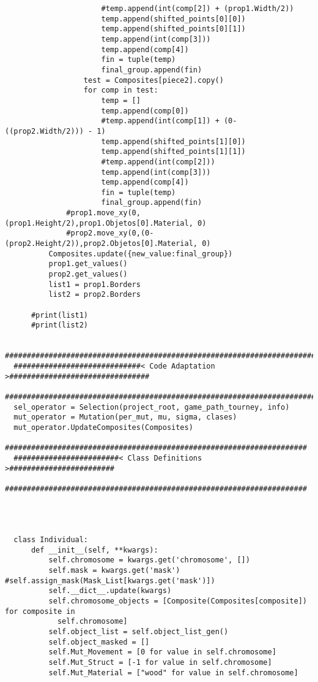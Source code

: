 \begin{verbatim}
                      #temp.append(int(comp[2]) + (prop1.Width/2))
                      temp.append(shifted_points[0][0])
                      temp.append(shifted_points[0][1])
                      temp.append(int(comp[3]))
                      temp.append(comp[4])
                      fin = tuple(temp)
                      final_group.append(fin)
                  test = Composites[piece2].copy()
                  for comp in test:
                      temp = []
                      temp.append(comp[0])
                      #temp.append(int(comp[1]) + (0-((prop2.Width/2))) - 1)
                      temp.append(shifted_points[1][0])
                      temp.append(shifted_points[1][1])
                      #temp.append(int(comp[2]))
                      temp.append(int(comp[3]))
                      temp.append(comp[4])
                      fin = tuple(temp)
                      final_group.append(fin)
              #prop1.move_xy(0,(prop1.Height/2),prop1.Objetos[0].Material, 0)
              #prop2.move_xy(0,(0-(prop2.Height/2)),prop2.Objetos[0].Material, 0)
          Composites.update({new_value:final_group})
          prop1.get_values()
          prop2.get_values()
          list1 = prop1.Borders
          list2 = prop2.Borders

      #print(list1)
      #print(list2)

  ################################################################################
  #############################< Code Adaptation >################################
  ################################################################################
  sel_operator = Selection(project_root, game_path_tourney, info)
  mut_operator = Mutation(per_mut, mu, sigma, clases)
  mut_operator.UpdateComposites(Composites)
  #####################################################################
  ########################< Class Definitions >########################
  #####################################################################

  
      
      
  class Individual:
      def __init__(self, **kwargs):
          self.chromosome = kwargs.get('chromosome', [])
          self.mask = kwargs.get('mask') #self.assign_mask(Mask_List[kwargs.get('mask')])
          self.__dict__.update(kwargs)
          self.chromosome_objects = [Composite(Composites[composite]) for composite in 
            self.chromosome]
          self.object_list = self.object_list_gen()
          self.object_masked = []
          self.Mut_Movement = [0 for value in self.chromosome]
          self.Mut_Struct = [-1 for value in self.chromosome]
          self.Mut_Material = ["wood" for value in self.chromosome]


\end{verbatim}
